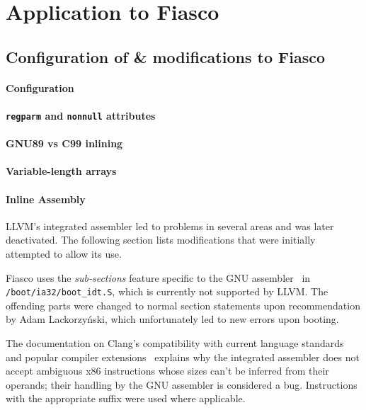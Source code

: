 \section{Application to Fiasco}

\subsection{Configuration of \& modifications to Fiasco}

\paragraph{Configuration}


\paragraph{\texttt{regparm} and \texttt{nonnull} attributes}


\paragraph{GNU89 vs C99 inlining}


\paragraph{Variable-length arrays}


\paragraph{Inline Assembly}

LLVM's integrated assembler led to problems in several areas and was later
deactivated. The following section lists modifications that were initially
attempted to allow its use.

Fiasco uses the \emph{sub-sections} feature specific to the GNU
assembler~\cite{gas-subsections} in \texttt{/boot\-/ia32\-/boot\_idt.S}, which
is currently not supported by LLVM. The offending parts were changed to normal
section statements upon recommendation by Adam
Lackorzyński, which unfortunately led to new errors upon booting.

The documentation on Clang's compatibility with current language standards and
popular compiler extensions~\cite[Inline assembly]{clang-compatibility}
explains why the integrated assembler does not accept ambiguous x86
instructions whose sizes can't be inferred from their operands; their handling
by the GNU assembler is considered a bug. Instructions with the appropriate
suffix were used where applicable.

